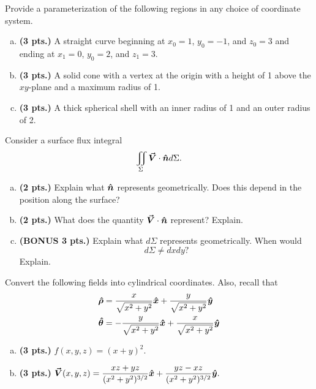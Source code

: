 \documentclass[12pt]{amsbook}
\newcommand{\vecfieldV}{\boldsymbol{\vec{V}}}
\newcommand{\thetahat}{\boldsymbol{\hat{\theta}}}
\newcommand{\rhohat}{\boldsymbol{\hat{\rho}}}
\begin{document}
\begin{problem}
	Provide a parameterization of the following regions in any choice of coordinate system.
	\begin{enumerate}[(a)]
		\item \textbf{(3 pts.)} A straight curve beginning at $x_0=1$, $y_0=-1$, and $z_0=3$ and ending at $x_1 = 0$, $y_0=2$, and $z_1=3$.
		\item \textbf{(3 pts.)} A solid cone with a vertex at the origin with a height of 1 above the $xy$-plane and a maximum radius of 1.
		\item \textbf{(3 pts.)} A thick spherical shell with an inner radius of 1 and an outer radius of 2.
	\end{enumerate}
\end{problem}

\begin{problem}
Consider a surface flux integral
\[
    \iint_{\Sigma} \vecfieldV \cdot \unitvec d\Sigma.
\]
\begin{enumerate}[(a)]
    \item \textbf{(2 pts.)} Explain what $\boldsymbol{\hat{n}}$ represents geometrically. Does this depend in the position along the surface?
    \item \textbf{(2 pts.)} What does the quantity $\vecfieldV \cdot \unitvec$ represent? Explain.
    \item \textbf{(BONUS 3 pts.)} Explain what $d\Sigma$ represents geometrically. When would \[d\Sigma \neq dx dy?\] Explain.
\end{enumerate}
\end{problem}

\begin{problem}
Convert the following fields into cylindrical coordinates. Also, recall that
\begin{align*}
\rhohat &= \frac{x}{\sqrt{x^2+y^2}}\xhat + \frac{y}{\sqrt{x^2+y^2}}\yhat \\
\thetahat &= -\frac{y}{\sqrt{x^2+y^2}}\xhat + \frac{x}{\sqrt{x^2+y^2}}\yhat
\end{align*}
\begin{enumerate}[(a)]
    \item \textbf{(3 pts.)} $f(x,y,z)= (x+y)^2$.
    \item \textbf{(3 pts.)} $\displaystyle{\vecfieldV(x,y,z) = \frac{xz+yz}{(x^2+y^2)^{3/2}}\xhat + \frac{yz-xz}{(x^2+y^2)^{3/2}}}\yhat.$
\end{enumerate}
\end{problem}
\end{document}
